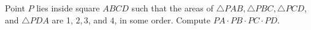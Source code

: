 Point $P$ lies inside square $A B C D$ such that the areas of $\triangle P A B, \triangle P B C, \triangle P C D$, and $\triangle P D A$ are 1, $2,3$, and $4$, in some order. Compute $P A \cdot P B \cdot P C \cdot P D$.